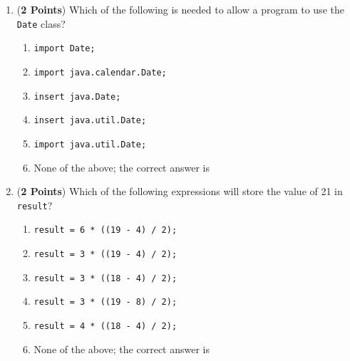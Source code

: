 \documentclass[12pt]{article}
\begin{document}
\begin{enumerate}
\newpage


\item ({\bf 2 Points})
  Which of the following is needed to allow a program to use the {\tt Date} class?
  \begin{enumerate}
    \item {\tt import Date;}
      \medskip 
    \item {\tt import java.calendar.Date;}
      \medskip 
    \item {\tt insert java.Date;}
      \medskip
    \item {\tt insert java.util.Date;}
      \medskip
    \item {\tt import java.util.Date;}
      \medskip
    \item None of the above; the correct answer is \underline{\hspace{3in}}
  \end{enumerate}


\bigskip
\bigskip

\item ({\bf 2 Points})
  Which of the following expressions will store the value of 21 in {\tt result}?
  \begin{enumerate}
    \item {\tt result = 6 * ((19 - 4) / 2);}
      \medskip 
    \item {\tt result = 3 * ((19 - 4) / 2);}
      \medskip 
    \item {\tt result = 3 * ((18 - 4) / 2);}
      \medskip 
    \item {\tt result = 3 * ((19 - 8) / 2);}
      \medskip
    \item {\tt result = 4 * ((18 - 4) / 2);}
      \medskip
    \item None of the above; the correct answer is \underline{\hspace{3in}}
  \end{enumerate}


\end{enumerate}
\end{document}
